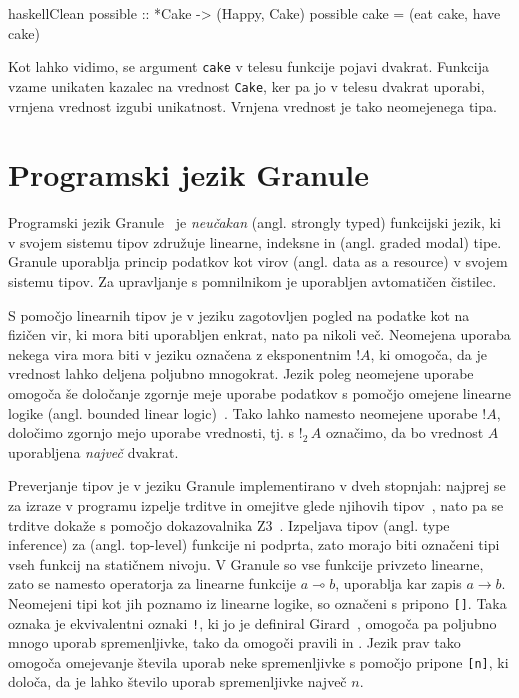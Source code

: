 \begin{code-box}{haskell}{Clean}
possible :: *Cake -> (Happy, Cake)
possible cake = (eat cake, have cake)
\end{code-box}

Kot lahko vidimo, se argument \texttt{cake} v telesu funkcije pojavi dvakrat. Funkcija vzame unikaten kazalec na vrednost \texttt{Cake}, ker pa jo v telesu dvakrat uporabi, vrnjena vrednost izgubi unikatnost. Vrnjena vrednost je tako neomejenega tipa.

\section{Programski jezik Granule}
\label{sec:granule}

Programski jezik Granule~\cite{orchard2019quantitative} je \textit{neučakan}  (angl. strongly typed) funkcijski jezik, ki v svojem sistemu tipov združuje linearne, indeksne in  (angl. graded modal) tipe. Granule uporablja princip podatkov kot virov (angl. data as a resource) v svojem sistemu tipov. Za upravljanje s pomnilnikom je uporabljen avtomatičen čistilec. 

S pomočjo linearnih tipov je v jeziku zagotovljen pogled na podatke kot na fizičen vir, ki mora biti uporabljen enkrat, nato pa nikoli več. Neomejena uporaba nekega vira mora biti v jeziku označena z eksponentnim  $!A$, ki omogoča, da je vrednost lahko deljena poljubno mnogokrat. Jezik poleg neomejene uporabe omogoča še določanje zgornje meje uporabe podatkov s pomočjo omejene linearne logike (angl. bounded linear logic)~\cite{girard1992bounded}. Tako lahko namesto neomejene uporabe $!A$, določimo zgornjo mejo uporabe vrednosti, tj. s $!_2 \, A$ označimo, da bo vrednost $A$ uporabljena \textit{največ} dvakrat.

Preverjanje tipov je v jeziku Granule implementirano v dveh stopnjah: najprej se za izraze v programu izpelje trditve in omejitve glede njihovih tipov~\cite{orchard2019quantitative}, nato pa se trditve dokaže s pomočjo dokazovalnika Z3~\cite{demoura2008z3}. Izpeljava tipov (angl. type inference) za  (angl. top-level) funkcije ni podprta, zato morajo biti označeni tipi vseh funkcij na statičnem nivoju. V Granule so vse funkcije privzeto linearne, zato se namesto operatorja za linearne funkcije $a \multimap b$, uporablja kar zapis $a \to b$. Neomejeni tipi kot jih poznamo iz linearne logike, so označeni s pripono \texttt{[]}. Taka oznaka je ekvivalentni oznaki \texttt{!}, ki jo je definiral Girard~\cite{girard1987linear}, omogoča pa poljubno mnogo uporab spremenljivke, tako da omogoči pravili  in . Jezik prav tako omogoča omejevanje števila uporab neke spremenljivke s pomočjo pripone \texttt{[n]}, ki določa, da je lahko število uporab spremenljivke največ $n$.

